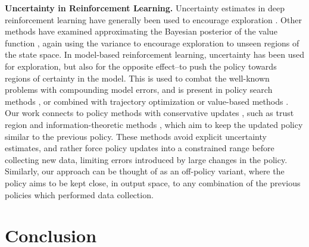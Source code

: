\documentclass{article}
\begin{document}
\textbf{Uncertainty in Reinforcement Learning.} Uncertainty estimates in deep reinforcement learning have generally been used to encourage exploration \citep{dearden1998bayesian, strehl2008analysis, UncertaintyBellman, azizzadenesheli2018bayesian}. Other methods have examined approximating the Bayesian posterior of the value function \citep{osband2016deep, osband2018randomized, touati2018randomized}, again using the variance to encourage exploration to unseen regions of the state space. 
In model-based reinforcement learning, uncertainty has been used for exploration, but also for the opposite effect--to push the policy towards regions of certainty in the model. This is used to combat the well-known problems with compounding model errors, and is present in policy search methods \citep{deisenroth2011pilco, gal2016improving, higuera2018synthesizing, xu2018algorithmic}, or combined with trajectory optimization \citep{chua2018deep} or value-based methods \citep{buckman2018sample}. Our work connects to policy methods with conservative updates \citep{kakade2002approximately}, such as trust region \citep{trpo,achiam2017constrained,pham2018constrained} and information-theoretic methods \citep{peters2010relative,van2017non}, which aim to keep the updated policy similar to the previous policy. These methods avoid explicit uncertainty estimates, and rather force policy updates into a constrained range before collecting new data, limiting errors introduced by large changes in the policy. Similarly, our approach can be thought of as an off-policy variant, where the policy aims to be kept close, in output space, to any combination of the previous policies which performed data collection.

\section{Conclusion}
\end{document}
